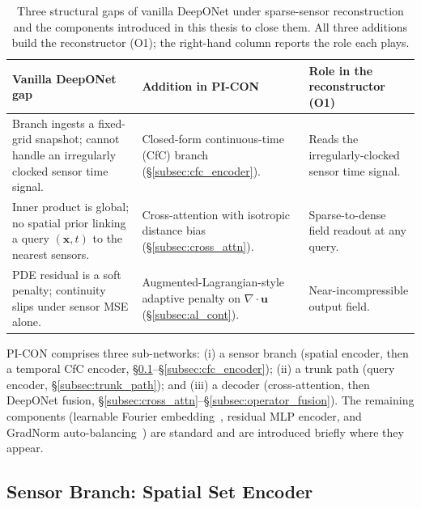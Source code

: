 \begin{table}[!htbp]
    \centering
    \caption{Three structural gaps of vanilla DeepONet under sparse-sensor reconstruction and the components introduced in this thesis to close them. All three additions build the reconstructor (O1); the right-hand column reports the role each plays.}
    \label{tab:deeponet_gaps}
    \small
    \setlength{\tabcolsep}{4pt}
    \begin{tabularx}{\textwidth}{>{\raggedright\arraybackslash}p{4.0cm}>{\raggedright\arraybackslash}p{4.4cm}>{\raggedright\arraybackslash}X}
    \toprule
    \textbf{Vanilla DeepONet gap} & \textbf{Addition in PI-CON} & \textbf{Role in the reconstructor (O1)} \\
    \midrule
    Branch ingests a fixed-grid snapshot; cannot handle an irregularly clocked sensor time signal. & Closed-form continuous-time (CfC) branch~\cite{Hasani2022CfC} (\S\ref{subsec:cfc_encoder}). & Reads the irregularly-clocked sensor time signal. \\
    Inner product is global; no spatial prior linking a query $(\mathbf{x},t)$ to the nearest sensors. & Cross-attention with isotropic distance bias~\cite{Vaswani2017Attention} (\S\ref{subsec:cross_attn}). & Sparse-to-dense field readout at any query. \\
    PDE residual is a soft penalty; continuity slips under sensor MSE alone. & Augmented-Lagrangian-style adaptive penalty on $\nabla\!\cdot\!\mathbf{u}$ (\S\ref{subsec:al_cont}). & Near-incompressible output field. \\
    \bottomrule
    \end{tabularx}
\end{table}

PI-CON comprises three sub-networks: (i) a sensor branch (spatial encoder, then a temporal CfC encoder, \S\ref{subsec:spatial_encoder}--\S\ref{subsec:cfc_encoder}); (ii) a trunk path (query encoder, \S\ref{subsec:trunk_path}); and (iii) a decoder (cross-attention, then DeepONet fusion, \S\ref{subsec:cross_attn}--\S\ref{subsec:operator_fusion}). The remaining components (learnable Fourier embedding~\cite{tancik2020fourierfeaturesletnetworks}, residual MLP encoder, and GradNorm auto-balancing~\cite{Chen2018ICML}) are standard and are introduced briefly where they appear.

\subsection{Sensor Branch: Spatial Set Encoder}
\label{subsec:spatial_encoder}

